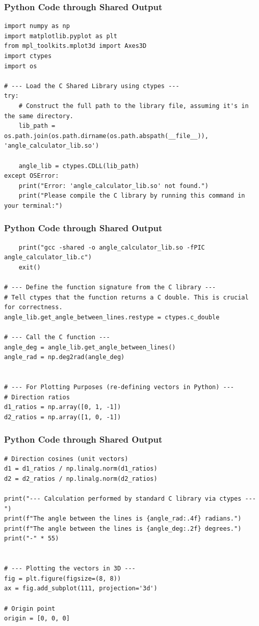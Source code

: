 \documentclass{beamer}
\begin{document}
\begin{frame}[fragile]
\frametitle{Python Code through Shared Output}
\begin{lstlisting}
import numpy as np
import matplotlib.pyplot as plt
from mpl_toolkits.mplot3d import Axes3D
import ctypes
import os

# --- Load the C Shared Library using ctypes ---
try:
    # Construct the full path to the library file, assuming it's in the same directory.
    lib_path = os.path.join(os.path.dirname(os.path.abspath(__file__)), 'angle_calculator_lib.so')

    angle_lib = ctypes.CDLL(lib_path)
except OSError:
    print("Error: 'angle_calculator_lib.so' not found.")
    print("Please compile the C library by running this command in your terminal:")
    \end{lstlisting}
\end{frame}  
\begin{frame}[fragile]
\frametitle{Python Code through Shared Output}
\begin{lstlisting}
    print("gcc -shared -o angle_calculator_lib.so -fPIC angle_calculator_lib.c")
    exit()

# --- Define the function signature from the C library ---
# Tell ctypes that the function returns a C double. This is crucial for correctness.
angle_lib.get_angle_between_lines.restype = ctypes.c_double

# --- Call the C function ---
angle_deg = angle_lib.get_angle_between_lines()
angle_rad = np.deg2rad(angle_deg)


# --- For Plotting Purposes (re-defining vectors in Python) ---
# Direction ratios
d1_ratios = np.array([0, 1, -1])
d2_ratios = np.array([1, 0, -1])
\end{lstlisting}
\end{frame}  
\begin{frame}[fragile]
\frametitle{Python Code through Shared Output}
\begin{lstlisting}
# Direction cosines (unit vectors)
d1 = d1_ratios / np.linalg.norm(d1_ratios)
d2 = d2_ratios / np.linalg.norm(d2_ratios)

print("--- Calculation performed by standard C library via ctypes ---")
print(f"The angle between the lines is {angle_rad:.4f} radians.")
print(f"The angle between the lines is {angle_deg:.2f} degrees.")
print("-" * 55)


# --- Plotting the vectors in 3D ---
fig = plt.figure(figsize=(8, 8))
ax = fig.add_subplot(111, projection='3d')

# Origin point
origin = [0, 0, 0]
\end{lstlisting}
\end{frame}  
\end{document}
